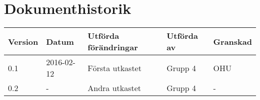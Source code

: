 \documentclass[11pt]{article}
\begin{document}
\tableofcontents

\pagebreak

\section*{Dokumenthistorik}
\begin{table}[h]
\begin{tabular}{|l|l|l|l|l|} \hline

\textbf{Version} & \textbf{Datum} & \textbf{Utförda förändringar} & \textbf{Utförda av} & \textbf{Granskad} \\ \hline
0.1 & 2016-02-12 &  Första utkastet & Grupp 4 & OHU \\ \hline
0.2 & - & Andra utkastet  & Grupp 4 & - \\ \hline
\end{tabular}
\end{table}

\pagebreak
{}
\end{document}

